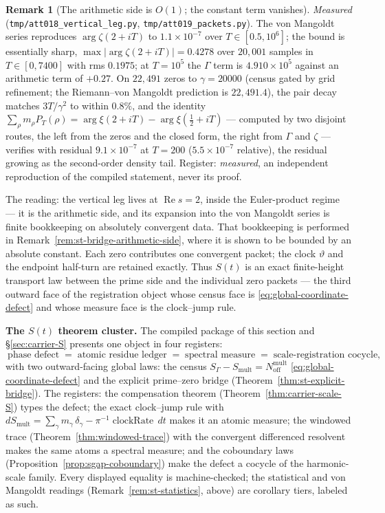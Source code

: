 \documentclass[11pt]{article}
\theoremstyle{definition}
\newtheorem{remark}[theorem]{Remark}
\renewcommand{\Re}{\operatorname{Re}}
\begin{document}
\begin{remark}[The arithmetic side is \(O(1)\); the constant term
vanishes]
\emph{Measured} (\texttt{tmp/att018\_vertical\_leg.py},
\texttt{tmp/att019\_packets.py}).  The von Mangoldt series reproduces
\(\arg\zeta(2+iT)\) to \(1.1\times10^{-7}\) over \(T\in[0.5,10^{6}]\); the
bound is essentially sharp, \(\max|\arg\zeta(2+iT)|=0.4278\) over \(20{,}001\)
samples in \(T\in[0,7400]\) with rms \(0.1975\); at \(T=10^{5}\) the \(\Gamma\)
term is \(4.910\times10^{5}\) against an arithmetic term of \(+0.27\).  On
\(22{,}491\) zeros to \(\gamma=20000\) (census gated by grid refinement; the
Riemann--von Mangoldt prediction is \(22{,}491.4\)), the pair decay matches
\(3T/\gamma^2\) to within \(0.8\%\), and the identity
\(\sum_\rho m_\rho P_T(\rho)=\arg\xi(2+iT)-\arg\xi(\tfrac12+iT)\) --- computed
by two disjoint routes, the left from the zeros and the closed form, the right
from \(\Gamma\) and \(\zeta\) --- verifies with residual \(9.1\times10^{-7}\)
at \(T=200\) (\(5.5\times10^{-7}\) relative), the residual growing as the
second-order density tail.  Register: \emph{measured}, an independent
reproduction of the compiled statement, never its proof.
\end{remark}

The reading: the vertical leg lives at \(\Re s=2\), inside the
Euler-product regime --- it is the arithmetic side, and its expansion into
the von Mangoldt series is finite bookkeeping on absolutely convergent
data.  That bookkeeping is performed in
Remark~\ref{rem:st-bridge-arithmetic-side}, where it is shown to be
bounded by an absolute constant.  Each zero contributes one
convergent packet; the clock \(\vartheta\) and the endpoint half-turn are
retained exactly.  Thus \(S(t)\) is an exact finite-height transport law
between the prime side and the individual zero packets --- the third
outward face of the registration object whose census face is
\eqref{eq:global-coordinate-defect} and whose measure face is the
clock--jump rule.

\medskip
\noindent\textbf{The \(S(t)\) theorem cluster.}  The compiled package of
this section and \S\ref{sec:carrier-S} presents one object in four
registers:
\[
\boxed{\ \text{phase defect}
\;=\;\text{atomic residue ledger}
\;=\;\text{spectral measure}
\;=\;\text{scale-registration cocycle},\ }
\]
with two outward-facing global laws: the census
\(S_\Gamma-S_{\mathrm{mult}}=N_{\mathrm{off}}^{\mathrm{mult}}\)
\eqref{eq:global-coordinate-defect} and the explicit prime--zero bridge
(Theorem~\ref{thm:st-explicit-bridge}).  The registers: the compensation
theorem (Theorem~\ref{thm:carrier-scale-S}) types the defect; the exact
clock--jump rule with
\(dS_{\mathrm{mult}}=\sum_{\gamma}m_\gamma\,\delta_\gamma
-\pi^{-1}\operatorname{clockRate}\,dt\) makes it an atomic measure; the
windowed trace (Theorem~\ref{thm:windowed-trace}) with the convergent
differenced resolvent makes the same atoms a spectral measure; and the
coboundary laws (Proposition~\ref{prop:sgap-coboundary}) make the defect
a cocycle of the harmonic-scale family.  Every displayed equality is
machine-checked; the statistical and von Mangoldt readings
(Remark~\ref{rem:st-statistics}, above) are corollary tiers, labeled as
such.
\end{document}
